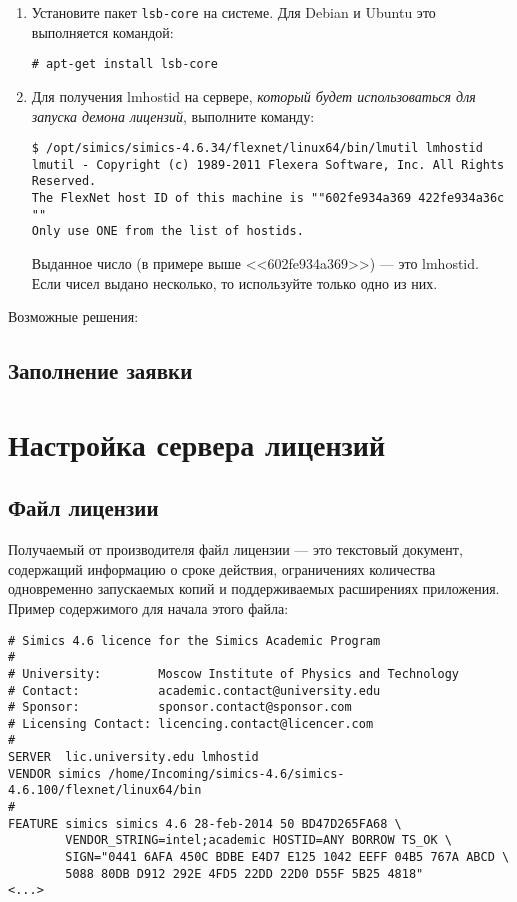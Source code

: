 \begin{enumerate}
    \item Установите пакет \texttt{lsb-core} на системе. Для Debian и Ubuntu это выполняется командой:
    
    \texttt{\# apt-get install lsb-core}
         
    \item Для получения lmhostid на сервере, \textit{который будет использоваться для запуска демона лицензий}, выполните команду:
    
\begin{lstlisting}
$ /opt/simics/simics-4.6.34/flexnet/linux64/bin/lmutil lmhostid
lmutil - Copyright (c) 1989-2011 Flexera Software, Inc. All Rights Reserved.
The FlexNet host ID of this machine is ""602fe934a369 422fe934a36c ""
Only use ONE from the list of hostids.
\end{lstlisting}

Выданное число (в примере выше <<602fe934a369>>) --- это lmhostid. Если чисел выдано несколько, то используйте только одно из них.
    
\end{enumerate}


Возможные решения:




\subsection{Заполнение заявки}




\section{Настройка сервера лицензий}


\subsection{Файл лицензии}

Получаемый от производителя файл лицензии --- это текстовый документ, содержащий информацию о сроке действия, ограничениях количества одновременно запускаемых копий и поддерживаемых расширениях приложения. Пример содержимого для начала этого файла:

\begin{lstlisting}
# Simics 4.6 licence for the Simics Academic Program
#
# University:        Moscow Institute of Physics and Technology
# Contact:           academic.contact@university.edu
# Sponsor:           sponsor.contact@sponsor.com
# Licensing Contact: licencing.contact@licencer.com
#
SERVER  lic.university.edu lmhostid
VENDOR simics /home/Incoming/simics-4.6/simics-4.6.100/flexnet/linux64/bin
#
FEATURE simics simics 4.6 28-feb-2014 50 BD47D265FA68 \
        VENDOR_STRING=intel;academic HOSTID=ANY BORROW TS_OK \
        SIGN="0441 6AFA 450C BDBE E4D7 E125 1042 EEFF 04B5 767A ABCD \
        5088 80DB D912 292E 4FD5 22DD 22D0 D55F 5B25 4818"
<...>
\end{lstlisting}

